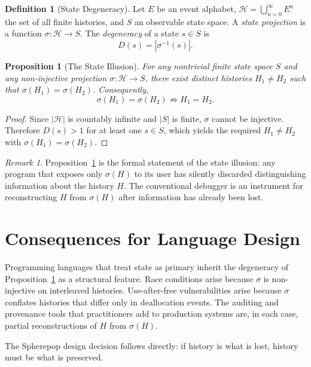 \documentclass[12pt, a4paper, openany]{book}
\theoremstyle{plain}
\newtheorem{proposition}[theorem]{Proposition}
\theoremstyle{definition}
\newtheorem{definition}[theorem]{Definition}
\theoremstyle{remark}
\newtheorem{remark}[theorem]{Remark}
\newcommand{\calH}{\mathcal{H}}
\begin{document}
\begin{definition}[State Degeneracy]
Let $E$ be an event alphabet, $\calH = \bigcup_{n=0}^{\infty} E^n$ the set of all
finite histories, and $S$ an observable state space. A \emph{state projection} is
a function $\sigma : \calH \to S$. The \emph{degeneracy} of a state $s \in S$ is
\[
D(s) = |\sigma^{-1}(s)|.
\]
\end{definition}

\begin{proposition}[The State Illusion]
\label{prop:state-illusion}
For any nontrivial finite state space $S$ and any non-injective projection
$\sigma : \calH \to S$, there exist distinct histories $H_1 \neq H_2$ such that
$\sigma(H_1) = \sigma(H_2)$. Consequently,
\[
\sigma(H_1) = \sigma(H_2) \not\Rightarrow H_1 = H_2.
\]
\end{proposition}

\begin{proof}
Since $|\calH|$ is countably infinite and $|S|$ is finite, $\sigma$ cannot be
injective. Therefore $D(s) > 1$ for at least one $s \in S$, which yields the
required $H_1 \neq H_2$ with $\sigma(H_1) = \sigma(H_2)$.
\end{proof}

\begin{remark}
Proposition~\ref{prop:state-illusion} is the formal statement of the state
illusion: any program that exposes only $\sigma(H)$ to its user has silently
discarded distinguishing information about the history $H$. The conventional
debugger is an instrument for reconstructing $H$ from $\sigma(H)$ after
information has already been lost.
\end{remark}

\section{Consequences for Language Design}

Programming languages that treat state as primary inherit the degeneracy of
Proposition~\ref{prop:state-illusion} as a structural feature. Race conditions
arise because $\sigma$ is non-injective on interleaved histories. Use-after-free
vulnerabilities arise because $\sigma$ conflates histories that differ only in
deallocation events. The auditing and provenance tools that practitioners add to
production systems are, in each case, partial reconstructions of $H$ from $\sigma(H)$.

The Spherepop design decision follows directly: if history is what is lost,
history must be what is preserved.
\end{document}
